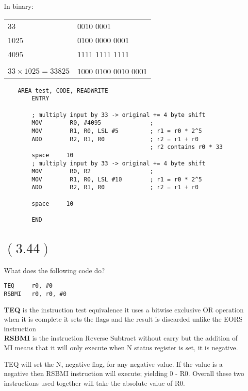\documentclass[letterpaper,12pt,titlepage]{article}
\begin{document}
\begin{mdframed}[style=MyFrame]
In binary: \\
\begin{tabular}{l l }
33 & 0010 0001 \\
1025 & 0100 0000 0001 \\
4095 & 1111 1111 1111 \\ \\
$33\times 1025 = 33825$ & 1000 0100 0010 0001
\end{tabular}

\begin{verbatim}
    AREA test, CODE, READWRITE    
        ENTRY
        
        ; multiply input by 33 -> original += 4 byte shift
        MOV        R0, #4095              ; 
        MOV        R1, R0, LSL #5         ; r1 = r0 * 2^5 
        ADD        R2, R1, R0             ; r2 = r1 + r0
                                          ; r2 contains r0 * 33
        space     10                            
        ; multiply input by 33 -> original += 4 byte shift
        MOV        R0, R2                 ; 
        MOV        R1, R0, LSL #10        ; r1 = r0 * 2^5 
        ADD        R2, R1, R0             ; r2 = r1 + r0
        
        space     10
    
        END
\end{verbatim}
\end{mdframed}
\newpage
\section*{$(3.44)$} What does the following code do?
\begin{verbatim}
TEQ     r0, #0
RSBMI   r0, r0, #0
\end{verbatim}

\begin{mdframed}[style=MyFrame]
\textbf{TEQ} is the instruction test equivalence it uses a bitwise exclusive OR operation when it is complete it sets the flags and the result is discarded unlike the EORS instruction\\
\textbf{RSBMI} is the instruction Reverse Subtract without carry but the addition of MI means that it will only execute when N status register is set, it is negative. 

TEQ will set the N, negative flag, for any negative value. If the value is a negative then RSBMI instruction will execute; yielding 0 - R0. Overall these two instructions used together will take the absolute value of R0.
\end{mdframed}
\end{document}
